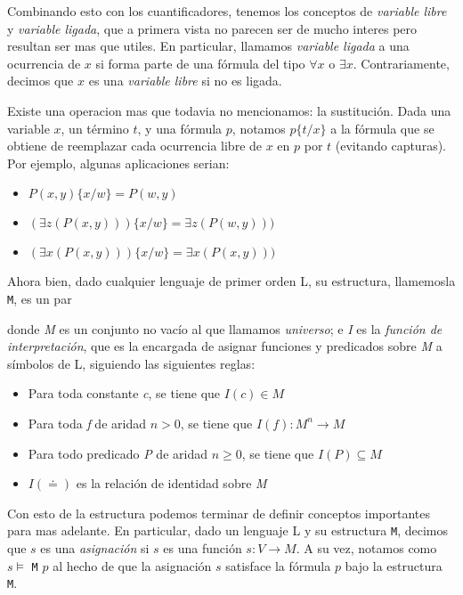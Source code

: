 \documentclass{article}
\begin{document}
Combinando esto con los cuantificadores, tenemos los conceptos de \textit{variable libre} y \textit{variable ligada}, que a primera vista no parecen ser de mucho interes pero resultan ser mas que utiles. En particular, llamamos \textit{variable ligada} a una ocurrencia de $x$ si forma parte de una fórmula del tipo $\forall x$ o $\exists x$. Contrariamente, decimos que $x$ es una \textit{variable libre} si no es ligada.

Existe una operacion mas que todavia no mencionamos: la sustitución. Dada una variable $x$, un término $t$, y una fórmula $p$, notamos $p \{ t / x \}$ a la fórmula que se obtiene de reemplazar cada ocurrencia libre de $x$ en $p$ por $t$ (evitando capturas). Por ejemplo, algunas aplicaciones serian:

\begin{itemize}
	\item $P(x, y) \{ x/w \} = P(w, y)$	
	\item $(\exists z (P(x, y))) \{ x/w \} = \exists z (P(w, y)))$	
	\item $(\exists x (P(x, y))) \{ x/w \} = \exists x (P(x, y)))$
\end{itemize}

Ahora bien, dado cualquier lenguaje de primer orden \textsc{L}, su estructura, llamemosla \texttt{M}, es un par


donde \textit{M} es un conjunto no vacío al que llamamos \textit{universo}; e \textit{I} es la \textit{función de interpretación}, que es la encargada de asignar funciones y predicados sobre \textit{M} a símbolos de \textsc{L}, siguiendo las siguientes reglas:

\begin{itemize}
	\item Para toda constante \textit{c}, se tiene que $I(c) \in M$
	\item Para toda \textit{f} de aridad $n > 0$, se tiene que $I(f) : M^{n} \longrightarrow M$
	\item Para todo predicado \textit{P} de aridad $n \geq 0$, se tiene que $I(P) \subseteq M$
	\item $I(\doteq)$ es la relación de identidad sobre \textit{M}
\end{itemize}

Con esto de la estructura podemos terminar de definir conceptos importantes para mas adelante. En particular, dado un lenguaje \textsc{L} y su estructura \texttt{M}, decimos que $s$ es una \textit{asignación} si $s$ es una función $s : V \longrightarrow M$. A su vez, notamos como $s \models$ \texttt{M} $p$ al hecho de que la asignación $s$ satisface la fórmula $p$ bajo la estructura \texttt{M}.
\end{document}

